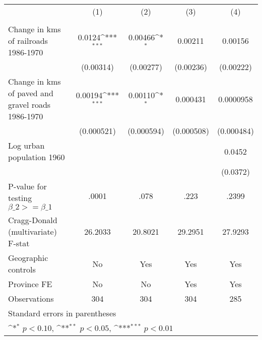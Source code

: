 {
\def\sym#1{\ifmmode^{#1}\else\(^{#1}\)\fi}
\begin{tabular}{l*{4}{c}}
\hline\hline
                &\multicolumn{1}{c}{(1)}&\multicolumn{1}{c}{(2)}&\multicolumn{1}{c}{(3)}&\multicolumn{1}{c}{(4)}\\
                &\multicolumn{1}{c}{}&\multicolumn{1}{c}{}&\multicolumn{1}{c}{}&\multicolumn{1}{c}{}\\
\hline
Change in kms of railroads 1986-1970&   0.0124\sym{***}&  0.00466\sym{*}  &  0.00211         &  0.00156         \\
                &(0.00314)         &(0.00277)         &(0.00236)         &(0.00222)         \\
[1em]
Change in kms of paved and gravel roads 1986-1970&  0.00194\sym{***}&  0.00110\sym{*}  & 0.000431         &0.0000958         \\
                &(0.000521)         &(0.000594)         &(0.000508)         &(0.000484)         \\
[1em]
Log urban population 1960&                  &                  &                  &   0.0452         \\
                &                  &                  &                  & (0.0372)         \\
\hline
P-value for testing $\beta\_{2} >= \beta\_{1}$&    .0001         &     .078         &     .223         &    .2399         \\
Cragg-Donald (multivariate) F-stat&  26.2033         &  20.8021         &  29.2951         &  27.9293         \\
Geographic controls&       No         &      Yes         &      Yes         &      Yes         \\
Province FE     &       No         &       No         &      Yes         &      Yes         \\
Observations    &      304         &      304         &      304         &      285         \\
\hline\hline
\multicolumn{5}{l}{\footnotesize Standard errors in parentheses}\\
\multicolumn{5}{l}{\footnotesize \sym{*} \(p<0.10\), \sym{**} \(p<0.05\), \sym{***} \(p<0.01\)}\\
\end{tabular}
}

